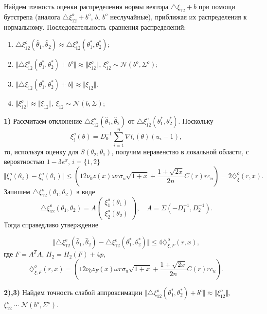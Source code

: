 Найдем точность оценки распределения нормы вектора  $\triangle \xi_{12} + b$ при помощи бутстрепа (аналога $\triangle \xi_{12}^{o} + b^{o}$,  $b$, $b^{o}$ неслучайные), приближая их распределения к нормальному. Последовательность сравнения распределений:
\begin{enumerate}
\item $\triangle \xi_{12}^{o}(\widehat{\theta}_1, \widehat{\theta}_2) \approx \triangle \xi_{12}^{o}(\theta_1^*, \theta_2^*)$;
\item  $\Vert \triangle \xi_{12}^{o}(\theta_1^*, \theta_2^*) + b^o \Vert  \approx  \Vert \xi_{12}^{o} \Vert$, $\xi_{12}^{o} \sim \mathcal{N}(b^o, \Sigma^o) $;
\item  $\Vert \triangle \xi_{12}(\theta_1^*, \theta_2^*) + b \Vert  \approx  \Vert \xi_{12} \Vert$.
\item  $\Vert \xi_{12}^{o}  \Vert  \approx  \Vert \xi_{12} \Vert$, $\xi_{12} \sim \mathcal{N}(b, \Sigma) $;
\end{enumerate}


\noindent\textbf{1)} Рассчитаем отклонение $\triangle \xi_{12}^{o}(\widehat{\theta}_1, \widehat{\theta}_2)$ от $\triangle \xi_{12}^{o}(\theta_1^*, \theta_2^*)$.  Поскольку 
\[
\xi_i^{o}(\theta) = D_0^{-1}  \sum_{i=1}^{n} \nabla l_i(\theta) (u_i - 1),
\]
то, используя оценку для $S(\theta_2, \theta_1)$, получим  неравенство в локальной области, с вероятностью $1- 3e^{x}$, $i = \{1,2\}$
\[
\Vert \xi_i^{o}(\theta_2) - \xi_i^{o}(\theta_1) \Vert \leq 
\left(
12 \nu_0  z(x) \omega r \sigma_u \sqrt{1+x} + 
\frac{1 + \sqrt{2x}}{2n}  C(r) r c_u
\right)  
 =  2 \diamondsuit_{\xi}^{o}(r,x). 
\]
Запишем  $\triangle \xi_{12}^{o}(\theta_1, \theta_2)$ в виде 
\[
\triangle \xi_{12}^{o}(\theta_1, \theta_2) = A \left( \begin{array}{c}
\xi_1^{o}(\theta_1) \\
\xi_2^{o}(\theta_2)
\end{array}
\right),
\quad 
A = \Sigma \left( - D_1^{-1}, D_2^{-1}
\right).
\]
Тогда справедливо утверждение 
\begin{lemma}
\[
\Vert \triangle \xi_{12}^{o}(\widehat{\theta}_1, \widehat{\theta}_2) - \triangle \xi_{12}^{o}(\theta_1^*, \theta_2^*) \Vert \leq 
  4 \diamondsuit_{\xi,F}^{o}(r,x), 
\]
где $F = A^T A$, $H_2 = H_2(F) + 4p$,
\[
\diamondsuit_{\xi,F}^{o}(r,x) = \left(
12 \nu_0  z_F(x) \omega r \sigma_u \sqrt{1+x} + 
\frac{1 + \sqrt{2x}}{2n}  C(r) r c_u
\right).
\]
\end{lemma}

\noindent\textbf{2),3)} Найдем точность слабой аппроксимации $\Vert \triangle \xi_{12}^{o}(\theta_1^*, \theta_2^*) + b^o \Vert  \approx  \Vert \xi_{12}^{o} \Vert$, $\xi_{12}^{o} \sim \mathcal{N}(b^o, \Sigma^o) $. 


